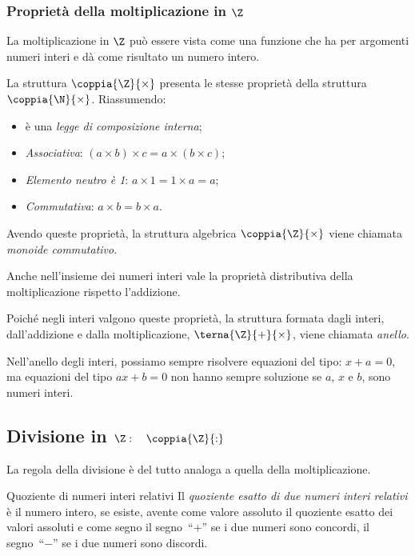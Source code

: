 \pagebreak %
\subsubsection{Proprietà della moltiplicazione in $\Z$}

La moltiplicazione in \(\Z\) può essere vista come una funzione che ha per 
argomenti numeri interi e dà come risultato un numero intero.

La struttura \(\coppia{\Z}{\times}\) presenta le stesse proprietà della 
struttura \(\coppia{\N}{\times}\).
Riassumendo:
\begin{itemize} [noitemsep]
 \item è una \emph{legge di composizione interna};
 \item \emph{Associativa}: \quad 
 \((a \times b) \times c = a \times (b \times c)\);
 \item \emph{Elemento neutro è 1}: \quad \(a \times 1 = 1 \times a = a\);
 \item \emph{Commutativa}: \quad \(a \times b = b \times a\).
\end{itemize}
Avendo queste proprietà, la struttura algebrica \(\coppia{\Z}{\times}\) viene 
chiamata \emph{monoide commutativo}.

Anche nell'insieme dei numeri interi vale la proprietà distributiva della
moltiplicazione rispetto l'addizione.

\bigskip
Poiché negli interi valgono queste proprietà, la struttura formata dagli 
interi, dall'addizione e dalla moltiplicazione, \(\terna{\Z}{+}{\times}\),
viene chiamata \emph{anello}.

Nell'anello degli interi, possiamo sempre risolvere equazioni del tipo:
\(x + a = 0\), ma equazioni del tipo \(ax + b = 0\) non hanno sempre 
soluzione se \(a\), \(x\) e \(b\), sono numeri interi.


\subsection{Divisione in $\Z: \quad \coppia{\Z}{:}$}

La regola della divisione è del tutto analoga a quella della 
moltiplicazione.

\begin{definizione}{Quoziente di numeri interi relativi}{}
Il \emph{quoziente esatto di due numeri interi relativi} è il numero intero, 
se esiste, avente come valore assoluto il quoziente esatto dei valori 
assoluti e come segno 
il segno~``\(+\)'' se i due numeri sono concordi,
il segno~``\(-\)'' se i due numeri sono discordi.
\end{definizione}

